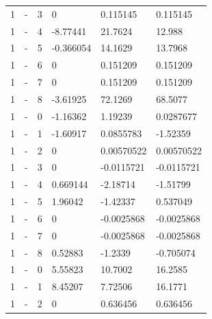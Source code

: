 \begin{longtable}
{}1 & \allowbreak{}-\allowbreak{} & 3 & 0 & 0.115145 & 0.115145 \\
{}1 & \allowbreak{}-\allowbreak{} & 4 & -8.77441 & 21.7624 & 12.988 \\
{}1 & \allowbreak{}-\allowbreak{} & 5 & -0.366054 & 14.1629 & 13.7968 \\
{}1 & \allowbreak{}-\allowbreak{} & 6 & 0 & 0.151209 & 0.151209 \\
{}1 & \allowbreak{}-\allowbreak{} & 7 & 0 & 0.151209 & 0.151209 \\
{}1 & \allowbreak{}-\allowbreak{} & 8 & -3.61925 & 72.1269 & 68.5077 \\
{}1 & \allowbreak{}-\allowbreak{} & 0 & -1.16362 & 1.19239 & 0.0287677 \\
{}1 & \allowbreak{}-\allowbreak{} & 1 & -1.60917 & 0.0855783 & -1.52359 \\
{}1 & \allowbreak{}-\allowbreak{} & 2 & 0 & 0.00570522 & 0.00570522 \\
{}1 & \allowbreak{}-\allowbreak{} & 3 & 0 & -0.0115721 & -0.0115721 \\
{}1 & \allowbreak{}-\allowbreak{} & 4 & 0.669144 & -2.18714 & -1.51799 \\
{}1 & \allowbreak{}-\allowbreak{} & 5 & 1.96042 & -1.42337 & 0.537049 \\
{}1 & \allowbreak{}-\allowbreak{} & 6 & 0 & -0.0025868 & -0.0025868 \\
{}1 & \allowbreak{}-\allowbreak{} & 7 & 0 & -0.0025868 & -0.0025868 \\
{}1 & \allowbreak{}-\allowbreak{} & 8 & 0.52883 & -1.2339 & -0.705074 \\
{}1 & \allowbreak{}-\allowbreak{} & 0 & 5.55823 & 10.7002 & 16.2585 \\
{}1 & \allowbreak{}-\allowbreak{} & 1 & 8.45207 & 7.72506 & 16.1771 \\
{}1 & \allowbreak{}-\allowbreak{} & 2 & 0 & 0.636456 & 0.636456 \\

\end{longtable}
